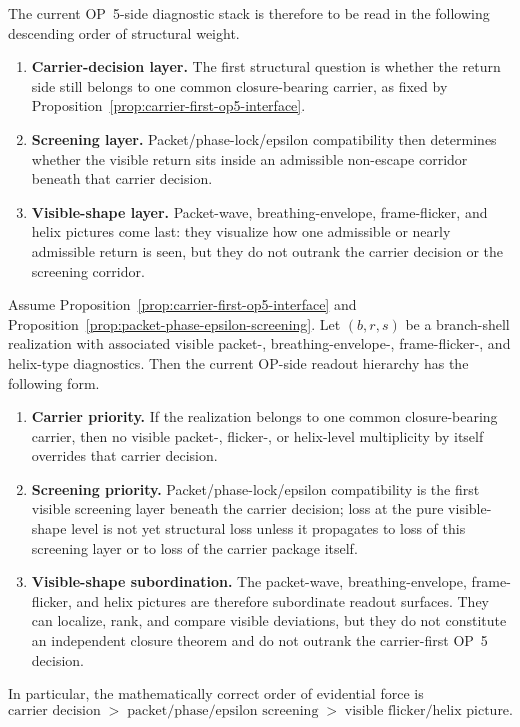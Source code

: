 \begin{remark}
The current OP~5-side diagnostic stack is therefore to be read in the following descending order of structural weight.
\begin{enumerate}[leftmargin=2em,label=(\roman*)]
\item \textbf{Carrier-decision layer.} The first structural question is whether the return side still belongs to one common closure-bearing carrier, as fixed by Proposition~\ref{prop:carrier-first-op5-interface}.
\item \textbf{Screening layer.} Packet/phase-lock/epsilon compatibility then determines whether the visible return sits inside an admissible non-escape corridor beneath that carrier decision.
\item \textbf{Visible-shape layer.} Packet-wave, breathing-envelope, frame-flicker, and helix pictures come last: they visualize how one admissible or nearly admissible return is seen, but they do not outrank the carrier decision or the screening corridor.
\end{enumerate}
\end{remark}

\begin{lemma}
\label{lem:diagnostic-readout-hierarchy}
Assume Proposition~\ref{prop:carrier-first-op5-interface} and Proposition~\ref{prop:packet-phase-epsilon-screening}. Let $(b,r,s)$ be a branch-shell realization with associated visible packet-, breathing-envelope-, frame-flicker-, and helix-type diagnostics. Then the current OP-side readout hierarchy has the following form.
\begin{enumerate}[leftmargin=2em,label=(\roman*)]
\item \textbf{Carrier priority.} If the realization belongs to one common closure-bearing carrier, then no visible packet-, flicker-, or helix-level multiplicity by itself overrides that carrier decision.
\item \textbf{Screening priority.} Packet/phase-lock/epsilon compatibility is the first visible screening layer beneath the carrier decision; loss at the pure visible-shape level is not yet structural loss unless it propagates to loss of this screening layer or to loss of the carrier package itself.
\item \textbf{Visible-shape subordination.} The packet-wave, breathing-envelope, frame-flicker, and helix pictures are therefore subordinate readout surfaces. They can localize, rank, and compare visible deviations, but they do not constitute an independent closure theorem and do not outrank the carrier-first OP~5 decision.
\end{enumerate}
In particular, the mathematically correct order of evidential force is
\[
\text{carrier decision}
\;>\;
\text{packet/phase/epsilon screening}
\;>\;
\text{visible flicker/helix picture}.
\]
\end{lemma}

